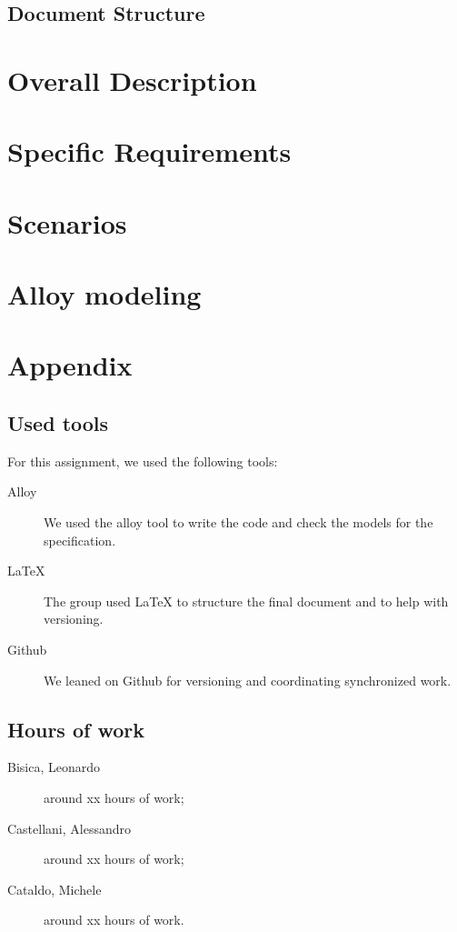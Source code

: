 \documentclass[12pt, a4paper]{article}
\begin{document}
		\subsection{Document Structure}	
			
		


	\newpage
	\section{Overall Description}
		


	\newpage
	\section{Specific Requirements}
		

	\newpage
	\section{Scenarios}
		


	\newpage
	\section{Alloy modeling}


	\newpage	
	\section{Appendix}
		\listoffigures
		\listoftables
		
		\subsection{Used tools}
		For this assignment, we used the following tools:
		
		\begin{description}
			\item [Alloy] We used the alloy tool to write the code and check the models for the specification.
			\item [LaTeX] The group used LaTeX to structure the final document and to help with versioning.
			\item [Github] We leaned on Github for versioning and coordinating synchronized work.
			
		\end{description}
		
		\subsection{Hours of work}
			\begin{description}
				\item[Bisica, Leonardo] around xx hours of work;
				\item[Castellani, Alessandro] around xx hours of work;
				\item[Cataldo, Michele] around xx hours of work.
			\end{description}
			
\end{document}
